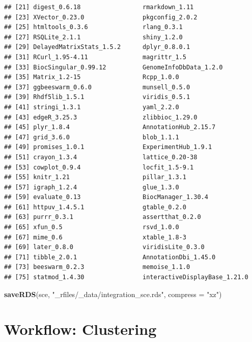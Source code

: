 \documentclass[]{book}
\newenvironment{Shaded}{\begin{snugshade}}{\end{snugshade}}
\newcommand{\DataTypeTok}[1]{\textcolor[rgb]{0.13,0.29,0.53}{#1}}
\newcommand{\KeywordTok}[1]{\textcolor[rgb]{0.13,0.29,0.53}{\textbf{#1}}}
\newcommand{\NormalTok}[1]{#1}
\newcommand{\StringTok}[1]{\textcolor[rgb]{0.31,0.60,0.02}{#1}}
\begin{document}
\begin{verbatim}
## [21] digest_0.6.18                 rmarkdown_1.11               
## [23] XVector_0.23.0                pkgconfig_2.0.2              
## [25] htmltools_0.3.6               rlang_0.3.1                  
## [27] RSQLite_2.1.1                 shiny_1.2.0                  
## [29] DelayedMatrixStats_1.5.2      dplyr_0.8.0.1                
## [31] RCurl_1.95-4.11               magrittr_1.5                 
## [33] BiocSingular_0.99.12          GenomeInfoDbData_1.2.0       
## [35] Matrix_1.2-15                 Rcpp_1.0.0                   
## [37] ggbeeswarm_0.6.0              munsell_0.5.0                
## [39] Rhdf5lib_1.5.1                viridis_0.5.1                
## [41] stringi_1.3.1                 yaml_2.2.0                   
## [43] edgeR_3.25.3                  zlibbioc_1.29.0              
## [45] plyr_1.8.4                    AnnotationHub_2.15.7         
## [47] grid_3.6.0                    blob_1.1.1                   
## [49] promises_1.0.1                ExperimentHub_1.9.1          
## [51] crayon_1.3.4                  lattice_0.20-38              
## [53] cowplot_0.9.4                 locfit_1.5-9.1               
## [55] knitr_1.21                    pillar_1.3.1                 
## [57] igraph_1.2.4                  glue_1.3.0                   
## [59] evaluate_0.13                 BiocManager_1.30.4           
## [61] httpuv_1.4.5.1                gtable_0.2.0                 
## [63] purrr_0.3.1                   assertthat_0.2.0             
## [65] xfun_0.5                      rsvd_1.0.0                   
## [67] mime_0.6                      xtable_1.8-3                 
## [69] later_0.8.0                   viridisLite_0.3.0            
## [71] tibble_2.0.1                  AnnotationDbi_1.45.0         
## [73] beeswarm_0.2.3                memoise_1.1.0                
## [75] statmod_1.4.30                interactiveDisplayBase_1.21.0
\end{verbatim}

\begin{Shaded}
\begin{Highlighting}[]
\KeywordTok{saveRDS}\NormalTok{(sce, }\StringTok{"_rfiles/_data/integration_sce.rds"}\NormalTok{, }\DataTypeTok{compress =} \StringTok{"xz"}\NormalTok{)}
\end{Highlighting}
\end{Shaded}

\hypertarget{workflow-clustering}{%
\chapter{Workflow: Clustering}\label{workflow-clustering}}
\end{document}
